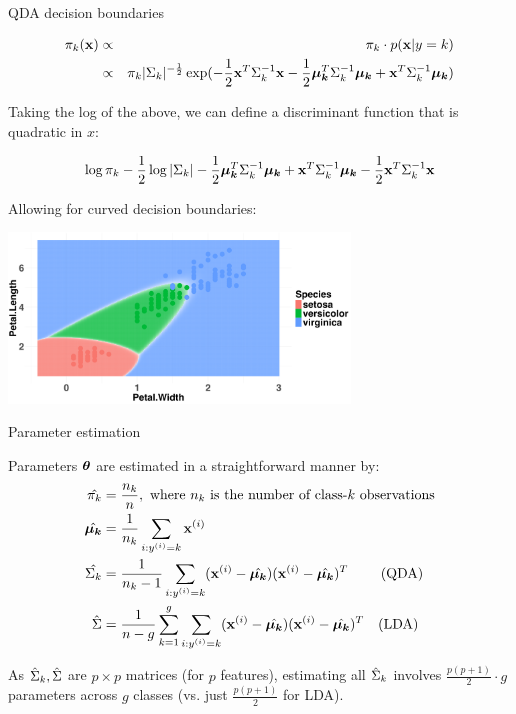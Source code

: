 \documentclass[11pt,compress,t,notes=noshow, xcolor=table]{beamer}
\begin{document}
\begin{vbframe}{QDA decision boundaries}

\vspace{-2em}
\begin{small}
\begin{eqnarray*}
\pi_{k}(\mathbf{x}) &\propto& \pi_{k} \cdot p(\mathbf{x} | y= k) \\
&\propto& \pi_{k} |\Sigma_k|^{-\frac{1}{2}}\exp(- \frac{1}{2} \mathbf{x}^T\Sigma_k^{-1}\mathbf{x} - \frac{1}{2} \bm{\mu_{k}}^T \Sigma_k^{-1} \bm{\mu_{k}} + \mathbf{x}^T \Sigma_k^{-1} \bm{\mu_{k}} )
\end{eqnarray*}

Taking the log of the above, we can define a discriminant function that is quadratic in $x$:

$$ \log \pi_{k} - \frac{1}{2} \log |\Sigma_k| - \frac{1}{2} \bm{\mu_{k}}^T \Sigma_k^{-1} \bm{\mu_{k}} + \mathbf{x}^T \Sigma_k^{-1} \bm{\mu_{k}} - \frac{1}{2} \mathbf{x}^T\Sigma_k^{-1}\mathbf{x} $$


Allowing for curved decision boundaries:

\vspace{-0.5em}
\begin{center}
\includegraphics[width=0.68\textwidth, clip=true, trim={0 0 0 20}]{figure/disc_db-qda.png}
\end{center}
\end{small}

\end{vbframe}

\begin{vbframe}{Parameter estimation}

Parameters $\bm{\theta}$ are estimated in a straightforward manner by:\\
\begin{equation*}
\begin{aligned}
\hat{\pi_{k}} &= \frac{n_k}{n},\text{ where $n_k$ is the number of class-$k$ observations} \\
\hat{\bm{\mu_{k}}} &= \frac{1}{n_k}\sum_{i:y^{(i)} = k} \mathbf{x}^{(i)} \\
\hat{\Sigma_k} &= \frac{1}{n_k - 1} \sum_{i: y^{(i)} = k} (\mathbf{x}^{(i)} - \hat{\bm{\mu_{k}}}) (\mathbf{x}^{(i)} - \hat{\bm{\mu_{k}}})^T \quad \quad \text{   (QDA)} \\
\hat{\Sigma} &= \frac{1}{n - g} \sum\limits_{k=1}^g \sum_{i: y^{(i)} = k} (\mathbf{x}^{(i)} - \hat{\bm{\mu_{k}}}) (\mathbf{x}^{(i)} - \hat{\bm{\mu_{k}}})^T \quad \text{(LDA)} \\
\end{aligned}
\end{equation*}

\lz

As $\hat \Sigma_k, \hat \Sigma$ are $p \times p$ matrices (for $p$ features), estimating all $\hat \Sigma_k$ involves $\frac{p(p+1)}{2} \cdot g$ parameters across $g$ classes (vs. just $\frac{p(p+1)}{2}$ for LDA).
\end{vbframe}
\end{document}
